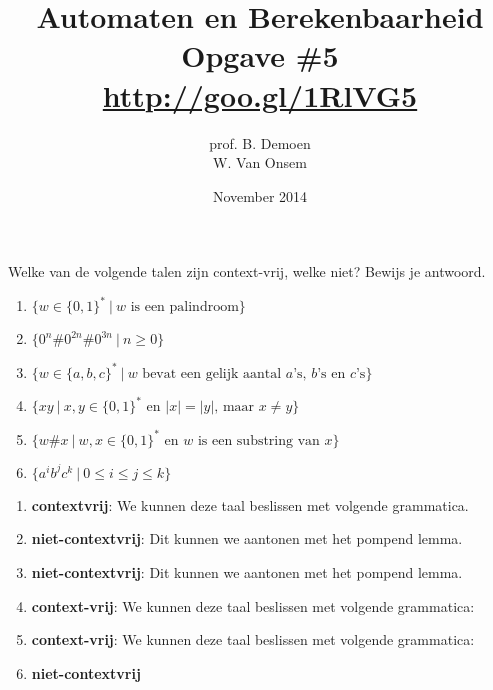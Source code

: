 \documentclass[a4paper]{article}
\title{Automaten en Berekenbaarheid\\Opgave \#5\\\url{http://goo.gl/1RlVG5}}
\author{prof. B. Demoen\\W. Van Onsem}
\date{November 2014}
\begin{document}
\maketitle

\begin{question}
Welke van de volgende talen zijn context-vrij, welke niet? Bewijs je antwoord.
  \begin{enumerate}
		    \item $\{ w \in \{0,1\}^* \ | \ \text{$w$ is een palindroom}\}$
      \item $\{ 0^n\#0^{2n}\#0^{3n} \ | \ n \geq 0 \}$
      \item $\{ w \in \{a,b,c\}^* \ | \ \text{$w$ bevat een gelijk aantal $a$'s, $b$'s en $c$'s} \}$
      \item $\{ xy \ | \ \text{$x,y \in \{0,1\}^*$ en $|x| = |y|$, maar $x \neq y$} \}$
      \item $\{ w \# x \ | \ \text{$w,x \in \{0,1\}^*$ en $w$ is een substring van $x$} \}$
		    \item $\{a^ib^jc^k \ | \ 0 \leq i \leq j \leq k \}$
  \end{enumerate}
\begin{answer}
\begin{enumerate}~~
\item \textbf{contextvrij}: We kunnen deze taal beslissen met volgende grammatica.
\item \textbf{niet-contextvrij}: Dit kunnen we aantonen met het pompend lemma.
\item \textbf{niet-contextvrij}: Dit kunnen we aantonen met het pompend lemma.
\item \textbf{context-vrij}: We kunnen deze taal beslissen met volgende grammatica:
\item \textbf{context-vrij}: We kunnen deze taal beslissen met volgende grammatica:
\item \textbf{niet-contextvrij}
\end{enumerate}
\end{answer}
\end{question}
\end{document}
